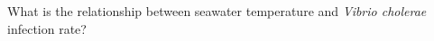 \begin{frame}[t]
    \begin{adjustwidth}{-2em}{-1.5em}
        \vspace{-3mm}
        What is the relationship between seawater temperature and
        \textit{Vibrio cholerae} infection rate?


        \vspace{-2mm}
    \end{adjustwidth}
\end{frame}

